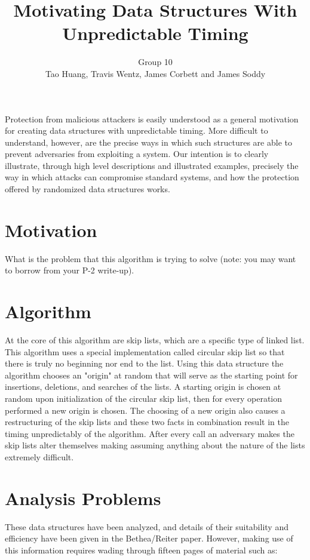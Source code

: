 \documentclass[11pt,twocolumn]{article}
\title{Motivating Data Structures With Unpredictable Timing}
\author{Group 10\\
\small{Tao Huang, Travis Wentz, James Corbett and James Soddy}}
\begin{document}
\maketitle

Protection from malicious attackers is easily understood as a general motivation
for creating data structures with unpredictable timing. More difficult to understand,
however, are the precise ways in which such structures are able to prevent adversaries
from exploiting a system. Our intention is to clearly illustrate, through
high level descriptions and illustrated examples, precisely the way in which attacks
can compromise standard systems, and how the protection offered by randomized
data structures works.

\section{Motivation}
What is the problem that this algorithm is trying to solve (note: you may want 
to borrow from your P-2 write-up).

\section{Algorithm}
 At the core of this algorithm are skip lists, which are a specific type of linked list. This algorithm uses a special implementation called circular skip list so that there is truly no beginning nor end to the list. Using this data structure the algorithm chooses an "origin" at random that will serve as the starting point for insertions, deletions, and searches of the lists. A starting origin is chosen at random upon initialization of the circular skip list, then for every operation performed a new origin is chosen. The choosing of a new origin also causes a restructuring of the skip lists and these two facts in combination result in the timing unpredictably of the algorithm. After every call an adversary makes the skip lists alter themselves making assuming anything about the nature of the lists extremely difficult. 
\section{Analysis Problems}
These data structures have been analyzed, and details of their suitability and
efficiency have been given in the Bethea/Reiter paper\cite{Bethea09}. However,
making use of this information requires wading through fifteen pages of material such as:
\end{document}
